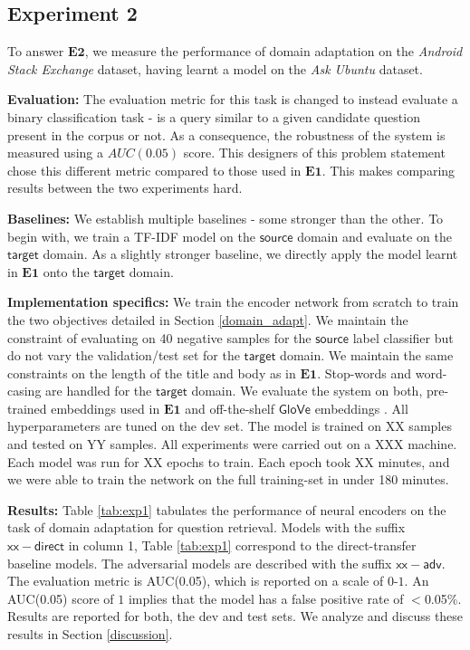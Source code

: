 \documentclass{sigkddExp}
\begin{document}
\subsection{Experiment 2} 
To answer $\mathbf{E2}$, we measure the performance of domain adaptation on the \textit{Android Stack Exchange} dataset, having learnt a model on the \textit{Ask Ubuntu} dataset.

\textbf{Evaluation:} The evaluation metric for this task is changed to instead evaluate a binary classification task - is a query similar to a given candidate question present in the corpus or not. As a consequence, the robustness of the system is measured using a $AUC(0.05)$ score. This designers of this problem statement chose this different metric compared to those used in $\mathbf{E1}$. This makes comparing results between the two experiments hard.

\textbf{Baselines:} We establish multiple baselines - some stronger than the other. To begin with, we train a TF-IDF model on the $\textsf{source}$ domain and evaluate on the $\textsf{target}$ domain. As a slightly stronger baseline, we directly apply the model learnt in $\mathbf{E1}$ onto the $\textsf{target}$ domain.

\textbf{Implementation specifics:} We train the encoder network from scratch to train the two objectives detailed in Section \ref{domain_adapt}. We maintain the constraint of evaluating on 40 negative samples for the $\mathsf{source}$ label classifier but do not vary the validation/test set for the $\mathsf{target}$ domain. We maintain the same constraints on the length of the title and body as in $\mathbf{E1}$. Stop-words and word-casing are handled for the $\mathsf{target}$ domain. We evaluate the system on both, pre-trained embeddings used in $\mathbf{E1}$ and off-the-shelf $\mathsf{GloVe}$ embeddings \cite{pennington2014glove}. All hyperparameters are tuned on the dev set. The model is trained on {\color{red} XX samples and tested on YY samples. All experiments were carried out on a XXX machine. Each model was run for {\color{red} XX epochs} to train. Each epoch took XX minutes, and we were able to train the network on the full training-set in under 180 minutes.}

\textbf{Results:} Table \ref{tab:exp1} tabulates the performance of neural encoders on the task of domain adaptation for question retrieval. Models with the suffix $\mathsf{xx-direct}$ in column 1, Table \ref{tab:exp1} correspond to the direct-transfer baseline models. The adversarial models are described with the suffix $\mathsf{xx-adv}$. The evaluation metric is AUC(0.05), which is reported on a scale of $0$-$1$. An AUC(0.05) score of $1$ implies that {\color{red}the model has a false positive rate of $<$0.05\%}. Results are reported for both, the dev and test sets. We analyze and discuss these results in Section \ref{discussion}.
\end{document}

